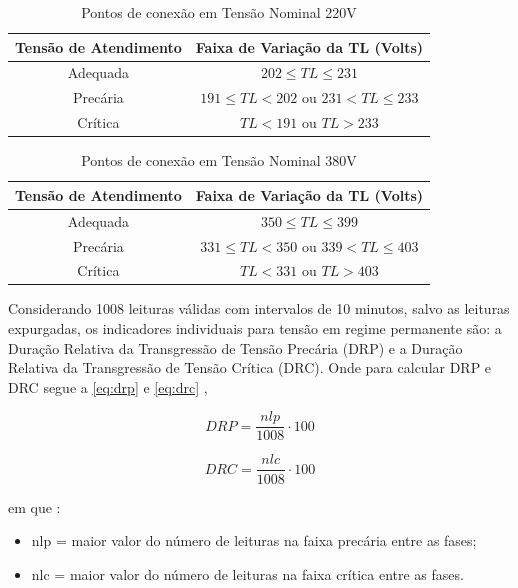 \begin{table}[H]
  \centering
  \caption{Pontos de conexão em Tensão Nominal 220V}
  \label{tab:tensao_220}
  \begin{tabular}{@{}cc@{}}
  \toprule
  \textbf{Tensão de Atendimento} & \textbf{Faixa de Variação da TL (Volts)} \\ \midrule
  Adequada & $202 \leq TL \leq 231$ \\
  Precária & $191 \leq TL < 202$ ou $231 < TL \leq 233$ \\
  Crítica & $TL < 191$ ou $TL > 233$ \\ \bottomrule
  \end{tabular}
\end{table}

\begin{table}[H]
  \centering
  \caption{Pontos de conexão em Tensão Nominal 380V}
  \label{tab:tensao_380}
  \begin{tabular}{@{}cc@{}}
  \toprule
  \textbf{Tensão de Atendimento} & \textbf{Faixa de Variação da TL (Volts)} \\ \midrule
  Adequada & $350 \leq TL \leq 399$ \\
  Precária & $331 \leq TL < 350$ ou $339 < TL \leq 403$ \\
  Crítica & $TL < 331$ ou $TL > 403$ \\ \bottomrule
  \end{tabular}
\end{table}

Considerando 1008 leituras válidas com intervalos de 10 minutos, salvo as leituras expurgadas, os indicadores individuais para tensão em regime permanente são: a Duração Relativa da Transgressão de Tensão Precária (DRP) e a Duração Relativa da Transgressão de Tensão Crítica (DRC). Onde para calcular DRP e DRC segue a \autoref{eq:drp} e \autoref{eq:drc} \cite{ref:ANEEL2021},

\begin{equation}
  DRP = \frac{nlp}{1008}\cdot100
  \label{eq:drp}
\end{equation}

\begin{equation}
  DRC = \frac{nlc}{1008}\cdot100
  \label{eq:drc}
\end{equation}

\noindent
em que \cite{ref:ANEEL2021}:

\begin{itemize}
  \item nlp = maior valor do número de leituras na faixa precária entre as fases;
  \item nlc = maior valor do número de leituras na faixa crítica entre as fases.
\end{itemize}

